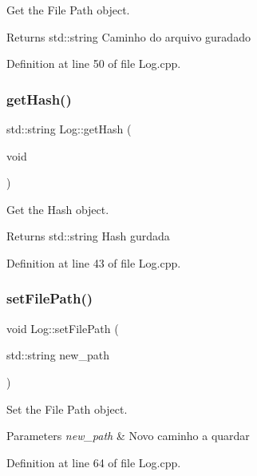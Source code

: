 Get the File Path object. 

\begin{DoxyReturn}{Returns}
std\+::string Caminho do arquivo guradado 
\end{DoxyReturn}


Definition at line 50 of file Log.\+cpp.

\mbox{\label{class_log_a9260683f85f7e9a2209cdaae19a1b582}} 
\subsubsection{\texorpdfstring{get\+Hash()}{getHash()}}
{\footnotesize\ttfamily std\+::string Log\+::get\+Hash (\begin{DoxyParamCaption}\item[{void}]{ }\end{DoxyParamCaption})}



Get the Hash object. 

\begin{DoxyReturn}{Returns}
std\+::string Hash gurdada 
\end{DoxyReturn}


Definition at line 43 of file Log.\+cpp.

\mbox{\label{class_log_ab5f872112a7932749aa07c1ba649020a}} 
\subsubsection{\texorpdfstring{set\+File\+Path()}{setFilePath()}}
{\footnotesize\ttfamily void Log\+::set\+File\+Path (\begin{DoxyParamCaption}\item[{std\+::string}]{new\+\_\+path }\end{DoxyParamCaption})}



Set the File Path object. 


\begin{DoxyParams}{Parameters}
{\em new\+\_\+path} & Novo caminho a quardar \\
\hline
\end{DoxyParams}


Definition at line 64 of file Log.\+cpp.

